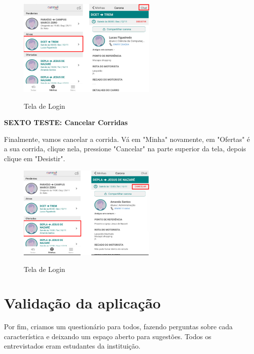 \begin{figure}[H]
	\centering
	\caption{Tela de Login}
	\includegraphics[width=0.6\textwidth]{./04-figuras/manual/chat.png}
	\label{fig:chat}
\end{figure}

\textbf{SEXTO TESTE: Cancelar Corridas}

Finalmente, vamos cancelar a corrida. Vá em "Minha" novamente, em "Ofertas" é a sua corrida, clique nela, pressione "Cancelar" na parte superior da tela, depois clique em "Desistir".

\begin{figure}[H]
	\centering
	\caption{Tela de Login}
	\includegraphics[width=0.6\textwidth]{./04-figuras/manual/cancelar_carona.png}
	\label{fig:cancelar_carona}
\end{figure}


\section{Validação da aplicação}

Por fim, criamos um questionário para todos, fazendo perguntas sobre cada característica e deixando um espaço aberto para sugestões. Todos os entrevistados eram estudantes da instituição.

